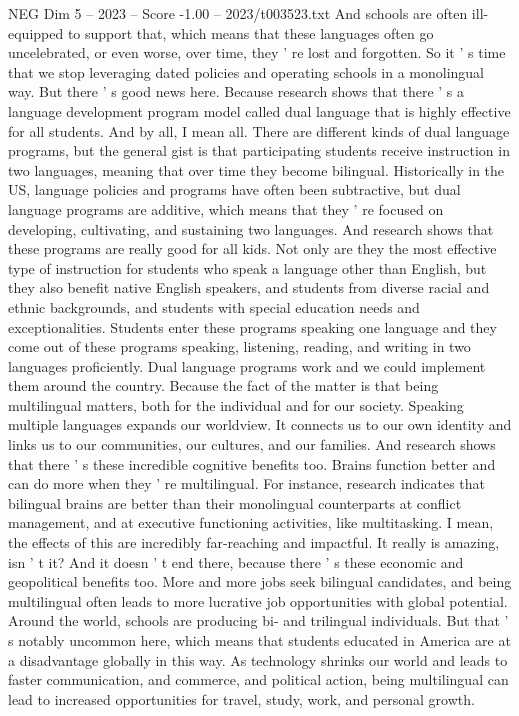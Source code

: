 \begin{textsample}{NEG Dim 5 – 2023 – Score -1.00 – 2023/t003523.txt}
And schools are often ill-equipped to support that, which means that these languages often go uncelebrated, or even worse, over time, they ' re lost and forgotten.
So it ' s time that we stop leveraging dated policies and operating schools in a monolingual way.
But there ' s good news here.
Because research shows that there ' s a language development program model called dual language that is highly effective for all students.
And by all, I mean all.
There are different kinds of dual language programs, but the general gist is that participating students receive instruction in two languages, meaning that over time they become bilingual.
Historically in the US, language policies and programs have often been subtractive, but dual language programs are additive, which means that they ' re focused on developing, cultivating, and sustaining two languages.
And research shows that these programs are really good for all kids.
Not only are they the most effective type of instruction for students who speak a language other than English, but they also benefit native English speakers, and students from diverse racial and ethnic backgrounds, and students with special education needs and exceptionalities.
Students enter these programs speaking one language and they come out of these programs speaking, listening, reading, and writing in two languages proficiently.
Dual language programs work and we could implement them around the country.
Because the fact of the matter is that being multilingual matters, both for the individual and for our society.
Speaking multiple languages expands our worldview.
It connects us to our own identity and links us to our communities, our cultures, and our families.
And research shows that there ' s these incredible cognitive benefits too.
Brains function better and can do more when they ' re multilingual.
For instance, research indicates that bilingual brains are better than their monolingual counterparts at conflict management, and at executive functioning activities, like multitasking.
I mean, the effects of this are incredibly far-reaching and impactful.
It really is amazing, isn ' t it?
And it doesn ' t end there, because there ' s these economic and geopolitical benefits too.
More and more jobs seek bilingual candidates, and being multilingual often leads to more lucrative job opportunities with global potential.
Around the world, schools are producing bi- and trilingual individuals.
But that ' s notably uncommon here, which means that students educated in America are at a disadvantage globally in this way.
As technology shrinks our world and leads to faster communication, and commerce, and political action, being multilingual can lead to increased opportunities for travel, study, work, and personal growth.

\end{textsample}
